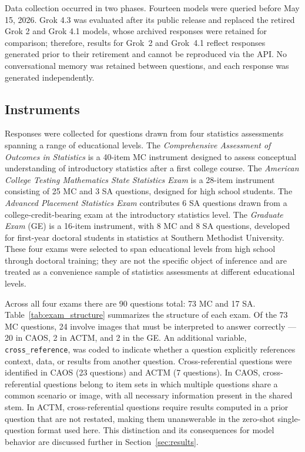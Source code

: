 \documentclass[APA,LATO2COL]{WileyNJDv5}
\begin{document}
Data collection occurred in two phases. Fourteen models were queried before May 15, 2026. Grok 4.3 was evaluated after its public release and replaced the retired Grok 2 and Grok 4.1 models, whose archived responses were retained for comparison; therefore, results for Grok~2 and Grok~4.1 reflect responses generated prior to their retirement and cannot be reproduced via the API. No conversational memory was retained between questions, and each response was generated independently.

\subsection{Instruments}
\label{sec:instruments}

Responses were collected for questions drawn from four statistics assessments
spanning a range of educational levels. The \textit{Comprehensive Assessment
of Outcomes in Statistics} \cite[CAOS]{caos} is a 40-item MC
instrument designed to assess conceptual understanding of introductory
statistics after a first college course. The \textit{American College Testing
Mathematics State Statistics Exam} \cite[ACTM]{ACTMExam} is a 28-item
instrument consisting of 25 MC and 3 SA questions, designed for high school
students. The \textit{Advanced Placement Statistics Exam} \cite[AP]{cb2011}
contributes 6 SA questions drawn from a college-credit-bearing exam at the
introductory statistics level. The \textit{Graduate Exam} (GE) is a 16-item
instrument, with 8 MC and 8 SA questions, developed for first-year doctoral students
in statistics at Southern Methodist University. These four exams were
selected to span educational levels from high school through doctoral training; they are not the specific object of inference and are treated as a
convenience sample of statistics assessments at different educational levels.

Across all four exams there are 90 questions total: 73 MC and 17 SA.
Table~\ref{tab:exam_structure} summarizes the structure of each exam. Of the
73 MC questions, 24 involve images that must be interpreted to answer
correctly --- 20 in CAOS, 2 in ACTM, and 2 in the GE. An additional
variable, \texttt{cross\_reference}, was coded to indicate whether a
question explicitly references context, data, or results from another
question. Cross-referential questions were identified in CAOS (23 questions)
and ACTM (7 questions). In CAOS, cross-referential questions belong to item
sets in which multiple questions share a common scenario or image, with all
necessary information present in the shared stem. In ACTM, cross-referential
questions require results computed in a prior question that are not
restated, making them unanswerable in the zero-shot single-question format
used here. This distinction and its consequences for model behavior are
discussed further in Section~\ref{sec:results}.
\end{document}
